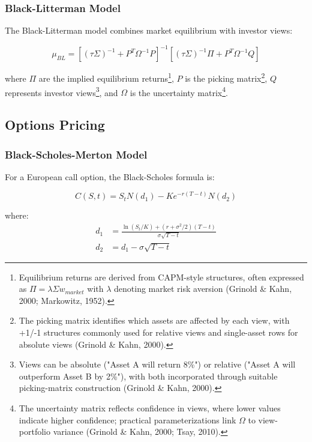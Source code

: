 \documentclass[12pt,a4paper]{article}
\theoremstyle{definition}
\theoremstyle{remark}
\begin{document}
\subsubsection{Black-Litterman Model}

The Black-Litterman model combines market equilibrium with investor views:

\begin{equation}
\mu_{BL} = \left[(\tau\Sigma)^{-1} + P^T\Omega^{-1}P\right]^{-1}\left[(\tau\Sigma)^{-1}\Pi + P^T\Omega^{-1}Q\right]
\end{equation}

where $\Pi$ are the implied equilibrium returns\footnote{Equilibrium returns are derived from CAPM-style structures, often expressed as $\Pi = \lambda \Sigma w_{market}$ with $\lambda$ denoting market risk aversion (Grinold \& Kahn, 2000; Markowitz, 1952).}, $P$ is the picking matrix\footnote{The picking matrix identifies which assets are affected by each view, with +1/-1 structures commonly used for relative views and single-asset rows for absolute views (Grinold \& Kahn, 2000).}, $Q$ represents investor views\footnote{Views can be absolute ("Asset A will return 8\%") or relative ("Asset A will outperform Asset B by 2\%"), with both incorporated through suitable picking-matrix construction (Grinold \& Kahn, 2000).}, and $\Omega$ is the uncertainty matrix\footnote{The uncertainty matrix reflects confidence in views, where lower values indicate higher confidence; practical parameterizations link $\Omega$ to view-portfolio variance (Grinold \& Kahn, 2000; Tsay, 2010).}.

\subsection{Options Pricing}

\subsubsection{Black-Scholes-Merton Model}

For a European call option, the Black-Scholes formula is:

\begin{equation}
C(S,t) = S_t N(d_1) - Ke^{-r(T-t)}N(d_2)
\end{equation}

where:
\begin{align}
d_1 &= \frac{\ln(S_t/K) + (r + \sigma^2/2)(T-t)}{\sigma\sqrt{T-t}} \\
d_2 &= d_1 - \sigma\sqrt{T-t}
\end{align}
\end{document}
